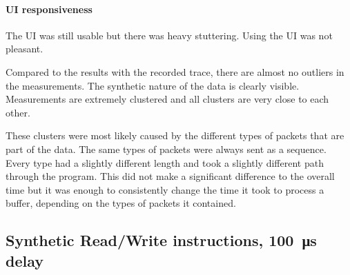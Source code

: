 \paragraph{UI responsiveness}

The UI was still usable but there was heavy stuttering. Using the UI was not pleasant.
\bigbreak

Compared to the results with the recorded trace, there are almost no outliers in the measurements.
The synthetic nature of the data is clearly visible. Measurements are extremely clustered and all
clusters are very close to each other.

These clusters were most likely caused by the different types of packets that are part of the data.
The same types of packets were always sent as a sequence. Every type had a slightly different length
and took a slightly different path through the program. This did not make a significant difference to
the overall time but it was enough to consistently change the time it took to process a buffer,
depending on the types of packets it contained.

\subsection{Synthetic Read/Write instructions, \SI{100}{\micro\second} delay}
\label{evaluation/results/synthetic-read-write-instructions-100us-delay}

